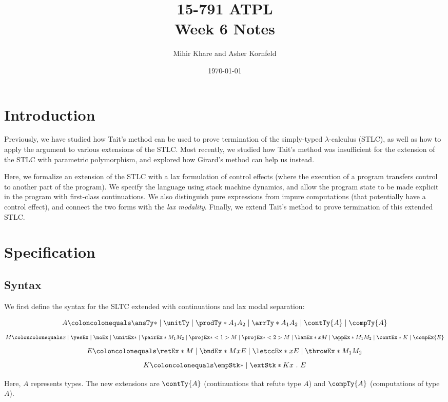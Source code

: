 \documentclass[letterpaper]{article}
\title{15-791 ATPL \\ Week 6 Notes}
\author{Mihir Khare and Asher Kornfeld}
\date{\today}
\begin{document}
\maketitle

\section{Introduction}

Previously, we have studied how Tait's method can be used to prove termination of the simply-typed $\lambda$-calculus (STLC), as well as how to apply the argument to various extensions of the STLC.
Most recently, we studied how Tait's method was insufficient for the extension of the STLC with parametric polymorphism, and explored how Girard's method can help us instead.


Here, we formalize an extension of the STLC with a lax formulation of control effects (where the execution of a program transfers control to another part of the program).
We specify the language using stack machine dynamics, and allow the program state to be made explicit in the program with first-class continuations.
We also distinguish pure expressions from impure computations (that potentially have a control effect), and connect the two forms with the \textit{lax modality}.
Finally, we extend Tait's method to prove termination of this extended STLC.

\section{Specification}

\subsection{Syntax}

We first define the syntax for the SLTC extended with continuations and lax modal separation:

$$
  A \coloncolonequals \ansTy* \mid \unitTy \mid \prodTy*{A_1}{A_2} \mid \arrTy*{A_1}{A_2} \mid \contTy{A} \mid \compTy{A}
$$
$$
  M \coloncolonequals x \mid \yesEx \mid \noEx \mid \unitEx* \mid \pairEx*{M_1}{M_2} \mid \projEx*<1>{M} \mid \projEx*<2>{M} \mid \lamEx*{x}{M} \mid \appEx*{M_1}{M_2} \mid \contEx*{K} \mid \compEx{E}
$$
$$
  E \coloncolonequals \retEx*{M} \mid \bndEx*{M}{x}{E} \mid \letccEx*{x}{E} \mid \throwEx*{M_1}{M_2}
$$
$$
  K \coloncolonequals \empStk* \mid \extStk*{K}{x\ .\ E}
$$

Here, $A$ represents types.
The new extensions are $\contTy{A}$ (continuations that refute type $A$) and $\compTy{A}$ (computations of type $A$).
\end{document}
